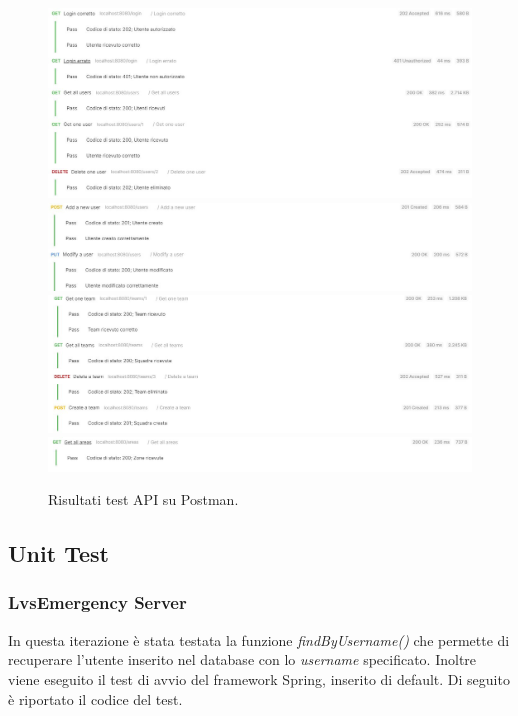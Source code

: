 \begin{itemize}
	\begin{figure}[h!]
		\centering
		\includegraphics[width=0.99\linewidth]{./Iterazione 2/ImageFiles/TestUserController1}
		\includegraphics[width=0.99\linewidth]{./Iterazione 2/ImageFiles/TestUserController2}
		\includegraphics[width=1\linewidth]{./Iterazione 2/ImageFiles/TestTeamController}
		\includegraphics[width=1\linewidth]{./Iterazione 2/ImageFiles/TestAreaController}
		\caption{Risultati test API su Postman.}
		\label{fig:RisultatiTestAPIIT2}
	\end{figure}
\end{itemize}

\clearpage

\subsection{Unit Test}
\subsubsection{LvsEmergency Server}
In questa iterazione è stata testata la funzione \textit{findByUsername()} che permette di recuperare l'utente inserito nel database con lo \textit{username} specificato. Inoltre viene eseguito il test di avvio del framework Spring, inserito di default. Di seguito è riportato il codice del test.

